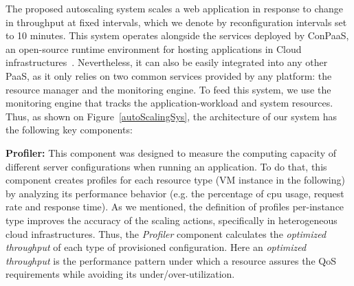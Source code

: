 
The proposed autoscaling system scales a web application in response to change in throughput at fixed intervals, which we denote by reconfiguration intervals set to 10 minutes.  This system operates alongside the services deployed by ConPaaS, an open-source runtime environment for hosting applications in Cloud infrastructures~\cite{conpaasIC}. Nevertheless, it can also be easily integrated into any other PaaS, as it only relies on two common services provided by any platform: the resource manager and the monitoring engine. To feed this system, we use the monitoring engine that tracks the application-workload and system resources. Thus, as shown on Figure~\ref{autoScalingSys}, the architecture of our system has the following key components:





\textbf{Profiler: } This component was designed to measure the computing capacity of different server configurations when running an application. To do that, this component creates profiles for each resource type (VM instance in the following) by analyzing its performance behavior (e.g. the percentage of cpu usage, request rate and response time).  As we mentioned, the definition of profiles per-instance type improves the accuracy of the scaling actions, specifically in heterogeneous cloud infrastructures. Thus, the \emph{Profiler} component calculates the \emph{optimized throughput} of each type of provisioned configuration. Here an \emph{optimized throughput} is the performance pattern under which a resource assures the QoS requirements while avoiding its under/over-utilization.







